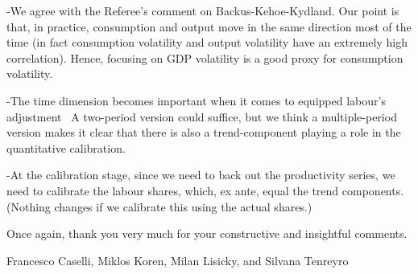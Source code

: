 \documentclass[12pt]{article}
\begin{document}
-We agree with the Referee's comment on Backus-Kehoe-Kydland. Our point is
that, in practice, consumption and output move in the same direction most of
the time (in fact consumption volatility and output volatility have an
extremely high correlation). Hence, focusing on GDP volatility is a good
proxy for consumption volatility.

-The time dimension becomes important when it comes to equipped labour's
adjustment \ A two-period version could suffice, but we think a
multiple-period version makes it clear that there is also a trend-component
playing a role in the quantitative calibration.

-At the calibration stage, since we need to back out the productivity
series, we need to calibrate the labour shares, which, ex ante, equal the
trend components. (Nothing changes if we calibrate this using the actual
shares.)

\medskip \medskip \bigskip

Once again, thank you very much for your constructive and insightful
comments.

Francesco Caselli, Miklos Koren, Milan Lisicky, and Silvana Tenreyro
\end{document}
